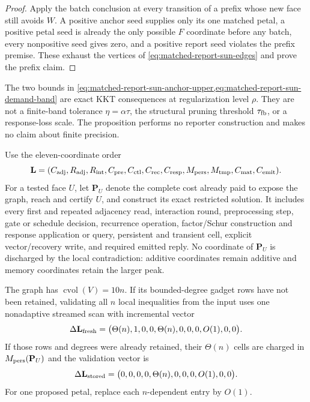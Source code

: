 \begin{proof}
Apply the batch conclusion at every transition of a prefix whose new face
still avoids $W$.  A positive anchor seed supplies only its one matched petal,
a positive petal seed is already the only possible $F$ coordinate before any
batch, every nonpositive seed gives zero, and a positive report seed violates
the prefix premise.  These exhaust the vertices of
\cref{eq:matched-report-sun-edges} and prove the prefix claim.
\end{proof}

\begin{remark}
\label{rem:matched-report-sun-trace-ledger}
The two bounds in
\cref{eq:matched-report-sun-anchor-upper,eq:matched-report-sun-demand-band}
are exact KKT consequences at regularization level $\rho$.  They are not a
finite-band tolerance $\eta=\alpha\tau$, the structural pruning threshold
$\tau_{\rm fb}$, or a response-loss scale.  The proposition performs no
reporter construction and makes no claim about finite precision.

Use the eleven-coordinate order
\begin{equation*}
 \mathbf L=
 (C_{\rm adj},R_{\rm adj},R_{\rm int},C_{\rm pre},C_{\rm ctl},
  C_{\rm rec},C_{\rm resp},M_{\rm pers},M_{\rm tmp},C_{\rm mat},C_{\rm emit}).
\end{equation*}
For a tested face $U$, let $\mathbf P_U$ denote the complete cost already paid
to expose the graph, reach and certify $U$, and construct its exact restricted
solution.  It includes every first and repeated adjacency read, interaction
round, preprocessing step, gate or schedule decision, recurrence operation,
factor/Schur construction and response application or query, persistent and
transient cell, explicit vector/recovery write, and required emitted reply.
No coordinate of $\mathbf P_U$ is discharged by the local contradiction:
additive coordinates remain additive and memory coordinates retain the larger
peak.

The graph has $\operatorname{cvol}(V)=10n$.  If its bounded-degree gadget rows
have not been retained, validating all $n$ local inequalities from the input
uses one nonadaptive streamed scan with incremental vector
\begin{equation}
 \Delta\mathbf L_{\rm fresh}
 =\bigl(\Theta(n),1,0,0,\Theta(n),0,0,0,O(1),0,0\bigr).
 \label{eq:matched-report-sun-fresh-audit-vector}
\end{equation}
If those rows and degrees were already retained, their $\Theta(n)$ cells are
charged in $M_{\rm pers}(\mathbf P_U)$ and the validation vector is
\begin{equation}
 \Delta\mathbf L_{\rm stored}
 =\bigl(0,0,0,0,\Theta(n),0,0,0,O(1),0,0\bigr).
 \label{eq:matched-report-sun-stored-audit-vector}
\end{equation}
For one proposed petal, replace each $n$-dependent entry by $O(1)$.


\end{remark}
